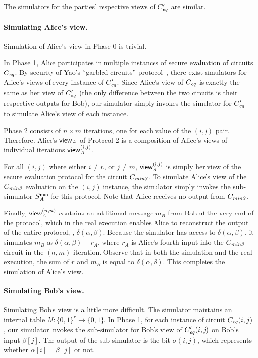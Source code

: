 The simulators for the parties' respective views of $C_{\mathit{eq}}'$ are similar.


\paragraph{Simulating Alice's view.}
Simulation of Alice's view in Phase 0 is trivial.

In Phase 1, Alice participates in multiple instances of secure
evaluation of circuits $C_{\mathit{eq}}$.  By security of Yao's ``garbled circuits''
protocol~\cite{LP04}, there exist simulators for Alice's views of every
instance of $C_{\mathit{eq}}'$.  Since Alice's view of $C_{\mathit{eq}}$ is exactly the same as
her view of $C_{\mathit{eq}}'$ (the only difference between the two circuits is their
respective outputs for Bob), our simulator simply invokes the simulator
for $C_{\mathit{eq}}'$ to simulate Alice's view of each instance.

Phase 2 consists of $n \times m$ iterations, one for each value of the
$(i,j)$ pair.  Therefore, Alice's $\mathsf{view}_A$ of Protocol 2 is a composition
of Alice's views of individual iterations $\mathsf{view}_A^{(i,j)}$.

For all $(i,j)$ where either $i \neq n$, or $j \neq m$, $\mathsf{view}_A^{(i,j)}$
is simply her view of the secure evaluation protocol for the circuit
$C_{\mathit{min3}}$.  To simulate Alice's view of the $C_{\mathit{min3}}$ evaluation on the $(i,j)$
instance, the simulator simply invokes the sub-simulator $S^\mathsf{min}_A$ for
this protocol.  Note that Alice receives no output from $C_{\mathit{min3}}$.

Finally, $\mathsf{view}_A^{(n,m)}$ contains an additional message $m_B$ from
Bob at the very end of the protocol, which in the real execution
enables Alice to reconstruct the output of the entire protocol,
\ie, $\delta(\alpha,\beta)$.  Because the simulator has access to
$\delta(\alpha,\beta)$, it simulates $m_B$ as $\delta(\alpha,\beta)-r_A$,
where $r_A$ is Alice's fourth input into the $C_{\mathit{min3}}$ circuit in the
$(n,m)$ iteration.  Observe that in both the simulation and the real
execution, the sum of $r$ and $m_B$ is equal to $\delta(\alpha,\beta)$.
This completes the simulation of Alice's view.


\paragraph{Simulating Bob's view.}
Simulating Bob's view is a little more difficult.  The simulator
maintains an internal table $M: \{0,1\}^r \rightarrow \{0,1\}$.
In Phase 1, for each instance of circuit $C_{\mathit{eq}}(i,j)$, our simulator
invokes the sub-simulator for Bob's view of $C_{\mathit{eq}}'(i,j)$ on Bob's input
$\beta[j]$.  The output of the sub-simulator is the bit $\sigma(i,j)$,
which represents whether $\alpha[i]=\beta[j]$ or not.  


